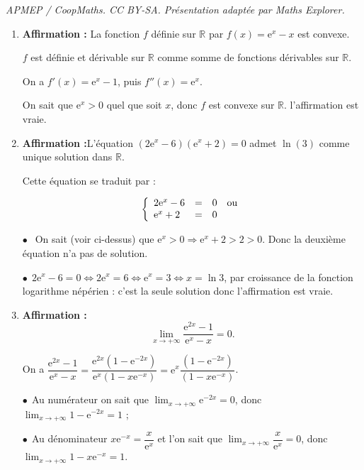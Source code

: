 \documentclass[10pt]{article}
\providecommand{\R}{\mathbb{R}}
\begin{document}
\noindent\textit{APMEP / CoopMaths. CC BY-SA. Présentation adaptée par Maths Explorer.}\par\medskip
\medskip

\begin{enumerate}
\item \textbf{Affirmation :} La fonction $f$ définie sur $\R$ par $f(x) = \text{e}^x - x$ est convexe.

$f$ est définie et dérivable sur $\R$ comme somme de fonctions dérivables sur $\R$.

On a $f'(x) = \text{e}^x - 1$, puis $f''(x) = \text{e}^x$.

On sait que $\text{e}^x > 0$ quel que soit $x$, donc $f$ est convexe sur $\R$. l'affirmation est vraie.

\item \textbf{Affirmation :}L'équation $\left(2\text{e}^x - 6\right)\left(\text{e}^x + 2\right) = 0$ admet $\ln (3)$ comme unique solution dans $\R$.

Cette équation se traduit par :

\[\left\{\begin{array}{l c l}
2\text{e}^x - 6&=&0\quad \text{ou}\\
\text{e}^x + 2&=&0
\end{array}\right.\]

$\bullet~~$ On sait (voir ci-dessus) que $\text{e}^x > 0 \Rightarrow \text{e}^x + 2  > 2 > 0 $. Donc la deuxième équation n'a pas de solution.

$\bullet~~$$2\text{e}^x - 6=0 \iff 2\text{e}^x =6 \iff \text{e}^x = 3 \iff x = \ln 3$, par croissance de la fonction logarithme népérien : c'est la seule solution donc l'affirmation est vraie.

\item \textbf{Affirmation :}\[\displaystyle\lim_{x \to + \infty} \dfrac{\text{e}^{2x} - 1}{\text{e}^x - x} = 0.\]

On a $\dfrac{\text{e}^{2x} - 1}{\text{e}^x - x} = \dfrac{\text{e}^{2x}\left(1 - \text{e}^{-2x} \right)}{\text{e}^{x}\left(1 - x\text{e}^{-x} \right)} = \text{e}^{x}\dfrac{\left(1 - \text{e}^{-2x} \right)}{\left(1 - x\text{e}^{-x} \right)}$.

$\bullet~~$Au numérateur on sait que $\displaystyle\lim_{x \to + \infty}\text{e}^{-2x} = 0$, donc $\displaystyle\lim_{x \to + \infty}1 - \text{e}^{-2x} = 1$ ;

$\bullet~~$Au dénominateur $x\text{e}^{-x} = \dfrac{x}{\text{e}^x}$ et l'on sait que $\displaystyle\lim_{x \to + \infty}\dfrac{x}{\text{e}^x} = 0$, donc $\displaystyle\lim_{x \to + \infty}1 - x\text{e}^{-x} = 1$.


\end{enumerate}
\end{document}
